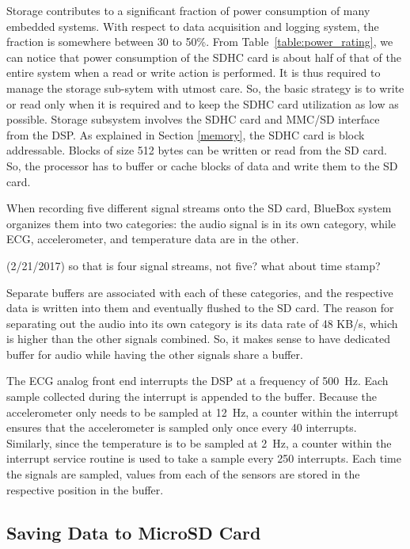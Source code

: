Storage contributes to a significant fraction of power consumption of
many embedded systems. With respect to data acquisition and logging
system, the fraction is somewhere between 30 to 50\%. From
Table~\ref{table:power_rating}, we can notice that power consumption
of the SDHC card is about half of that of the entire system when a
read or write action is performed. It is thus required to manage the
storage sub-sytem with utmost care. So, the basic strategy is to
write or read only when it is required and to keep the SDHC card
utilization as low as possible.  Storage subsystem involves the SDHC
card and MMC/SD interface from the DSP. As explained in Section
\ref{memory}, the SDHC card is block addressable.  Blocks of size 512
bytes can be written or read from the SD card. So, the processor has
to buffer or cache blocks of data and write them to the SD card.  

When recording five different signal streams onto the SD card, 
BlueBox system organizes them into two categories:
the audio signal is in its own category, while ECG, accelerometer,
and temperature data are in the other.
\begin{cmtPai}
	(2/21/2017) so that is four signal streams, not five?
	what about time stamp?
\end{cmtPai}
Separate buffers are associated with each of these categories, and
the respective data is written into them and eventually flushed to
the SD card. The reason for separating out the audio into its own
category is its data rate of 48 KB/s, which is higher than the other
signals combined.  So, it makes sense to have dedicated buffer for
audio while having the other signals share a buffer.

The ECG analog front end interrupts the DSP at a frequency of 500~Hz.
Each sample collected during the interrupt is appended to the buffer.
Because the accelerometer only needs to be sampled at 12~Hz, a
counter within the interrupt ensures that the accelerometer is
sampled only once every 40 interrupts. Similarly, since the
temperature is to be sampled at 2~Hz, a counter within the interrupt
service routine is used to take a sample every 250 interrupts. Each
time the signals are sampled, values from each of the sensors are
stored in the respective position in the buffer. 

\subsection{Saving Data to MicroSD Card}

